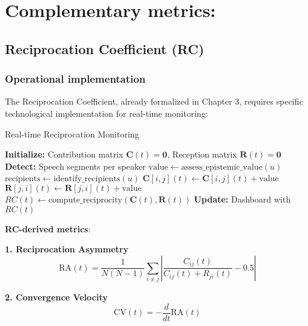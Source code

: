 \newpage

\section{Complementary metrics:}
\subsection{Reciprocation Coefficient (RC)}
\subsubsection*{Operational implementation}

The Reciprocation Coefficient, already formalized in Chapter 3, requires specific technological implementation for real-time monitoring:

\begin{algorithm}[H]
	\caption{Real-time Reciprocation Monitoring}
	\label{alg:rc-monitoring}
	\begin{algorithmic}[1]
		\State \textbf{Initialize:} Contribution matrix $\mathbf{C}(t) = \mathbf{0}$, Reception matrix $\mathbf{R}(t) = \mathbf{0}$
		\State \textbf{Detect:} Speech segments per speaker
		\State $\text{value} \gets \text{assess\_epistemic\_value}(u)$ 
		\State $\text{recipients} \gets \text{identify\_recipients}(u)$ 
		\State $\mathbf{C}[i,j](t) \gets \mathbf{C}[i,j](t) + \text{value}$
		\State $\mathbf{R}[j,i](t) \gets \mathbf{R}[j,i](t) + \text{value}$
		\EndFor
		\EndFor
		\State $RC(t) \gets \text{compute\_reciprocity}(\mathbf{C}(t), \mathbf{R}(t))$
		\State \textbf{Update:} Dashboard with $RC(t)$
		\EndWhile
	\end{algorithmic}
\end{algorithm}

\textbf{RC-derived metrics}:

\textbf{1. Reciprocation Asymmetry}
\begin{equation}
	\text{RA}(t) = \frac{1}{N(N-1)} \sum_{i \neq j} \left|\frac{C_{ij}(t)}{C_{ij}(t) + R_{ji}(t)} - 0.5\right|
	\label{eq:reciprocation-asymmetry}
\end{equation}

\textbf{2. Convergence Velocity}
\begin{equation}
	\text{CV}(t) = -\frac{d}{dt}\text{RA}(t)
	\label{eq:convergence-velocity}
\end{equation}

